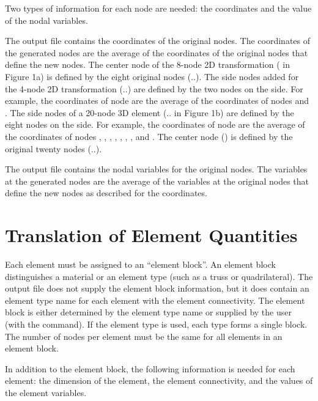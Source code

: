 Two types of information for each node are needed: the 
coordinates and the value of the nodal variables.

The  output file contains the coordinates of the 
original nodes.
The coordinates of the generated nodes
are the average of the coordinates of the original nodes that define the
new nodes. The center node of the 8-node 2D transformation (
in Figure 1a) is defined by the eight original nodes
(..). The side nodes added for the 4-node 2D
transformation (..) are defined by the two nodes
on the side. For example, the coordinates of node  are the
average of the coordinates of nodes  and . The
side nodes of a 20-node 3D element (.. in Figure
1b) are defined by the eight nodes on the side. For example, the
coordinates of node  are the average of the coordinates of
nodes , , , , ,
, , and . The center node
() is defined by the original twenty nodes
(..). 

The  output file contains the nodal variables for
the original nodes.
The variables at the
generated nodes are the average of the variables at the original nodes
that define the new nodes as described for the coordinates.

\section{Translation of Element Quantities} \label{intro:element}

Each element must be assigned to an ``element block''. An element block
distinguishes a material or an element type (such as a truss or
quadrilateral). The  output file does not supply the
element block information, but it does contain an element type name for
each element with the element connectivity. The element block is either
determined by the element type name or supplied by the user (with the
 command). If the element type is used, each type forms a
single block. The number of nodes per element must be the same for all
elements in an element block. 

In addition to the element block, the following information is needed
for each element: the dimension of the element, the element
connectivity, and the values of the element variables. 

